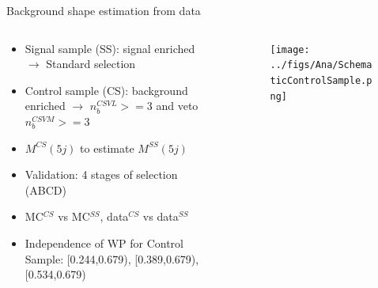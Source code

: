 \begin{frame}{Background shape estimation from data}
\vspace{-.2cm}

\begin{columns}
\begin{column}{.40\textwidth}
   \begin{block}{}\scriptsize
     \begin{itemize}
     \item Signal sample (SS): signal enriched \\$\to$ Standard selection
     \item Control sample (CS): background enriched $\to$ $n_{b}^{CSVL}>=3$ and veto $n_{b}^{CSVM}>=3$
     \item $M^{CS}(5j)$ to estimate $M^{SS}(5j)$
     \item Validation: 4 stages of selection (ABCD)
     \item MC$^{CS}$ vs MC$^{SS}$, data$^{CS}$ vs data$^{SS}$
     \item Independence of WP for Control Sample: [0.244,0.679), [0.389,0.679), [0.534,0.679)
     \end{itemize}
    \end{block}

\end{column}

\begin{column}{.60\textwidth}
\begin{figure}[!Hhtbp]
  \begin{center}
    \texttt{[image: ../figs/Ana/SchematicControlSample.png]}
  \end{center}
\end{figure}

\end{column}

\end{columns}

\end{frame}



